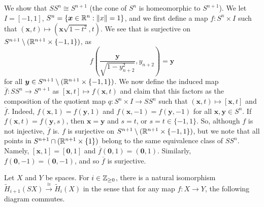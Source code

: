 \begin{example}
  We show that $SS^{n} \cong S^{n+1}$ (the cone of $S^n$ is homeomorphic to $S^{n+1}$). We let $I = [-1, 1]$, $S^n = \{\bm x \in \mathbb{R}^n: \lVert x \rVert = 1\}$, and we first define a map $f: S^n \times I$ such that $(\bm x, t) \mapsto (\bm x\sqrt{1-t^2}, t)$. We see that is surjective on $S^{n+1} \setminus (\mathbb{R}^{n+1} \times \{-1, 1\})$, as
  \[ f\left(\frac{\bm y}{\sqrt{1-y_{n+2}^2}}, y_{n+2}\right) = \bm y \]
  for all $\bm y \in S^{n+1} \setminus (\mathbb{R}^{n+1} \times \{-1, 1\})$. We now define the induced map $\overline f: SS^n \to S^{n+1}$ as $[\bm x, t] \mapsto f(\bm x, t)$ and claim that this factors as the composition of the quotient map $q: S^n \times I \to SS^n$ such that $(\bm x, t) \mapsto [\bm x, t]$ and $\overline f$. Indeed, $f(\bm x, 1) = f(\bm y, 1)$ and $f(\bm x, -1) = f(\bm y, -1)$ for all $\bm x, \bm y \in S^n$. If $f(\bm x, t) = f(\bm y, s)$, then $\bm x = \bm y$ and $s = t$, or $s = t \in \{-1,1\}$. So, although $f$ is not injective, $\overline f$ is. $f$ is surjective on $S^{n+1} \setminus (\mathbb{R}^{n+1} \times \{-1, 1\})$, but we note that all points in $S^{n+1} \cap (\mathbb{R}^{n+1} \times \{1\})$ belong to the same equivalence class of $SS^{n}$. Namely, $[\bm x, 1] = [\bm 0, 1]$ and $\overline f(\bm 0, 1) = (\bm 0, 1)$. Similarly, $f(\bm 0, -1) = (\bm 0, -1)$, and so $\overline f$ is surjective. 
\end{example}

\begin{proposition}
  Let $X$ and $Y$ be spaces. For $i \in \mathbb{Z}_{\geq 0}$, there is a natural isomorphism $\tilde H_{i+1}(SX) \xrightarrow{\cong} \tilde H_i(X)$ in the sense that for any map $f: X \to Y$, the following diagram commutes.
  \begin{center}
  \end{center}
\end{proposition}

